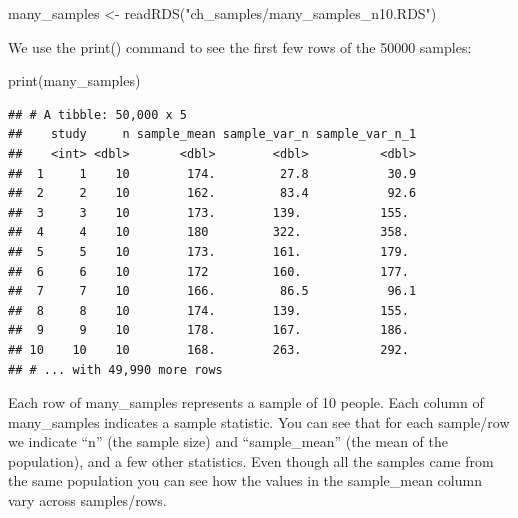 \documentclass[
]{krantz}
\makeatletter
\newenvironment{Shaded}{\begin{snugshade}}{\end{snugshade}}
\newcommand{\FunctionTok}[1]{\textcolor[rgb]{0,0,0}{#1}}
\newcommand{\NormalTok}[1]{#1}
\newcommand{\OtherTok}[1]{\textcolor[rgb]{0.37,0.37,0.37}{#1}}
\newcommand{\StringTok}[1]{\textcolor[rgb]{0.5,0.5,0.5}{#1}}
\newenvironment{kframe}{%
\medskip{}
\setlength{\fboxsep}{.8em}
 \def\at@end@of@kframe{}%
 \ifinner\ifhmode%
  \def\at@end@of@kframe{\end{minipage}}%
  \begin{minipage}{\columnwidth}%
 \fi\fi%
 \def\FrameCommand##1{\hskip\@totalleftmargin \hskip-\fboxsep
 \colorbox{shadecolor}{##1}\hskip-\fboxsep
     \hskip-\linewidth \hskip-\@totalleftmargin \hskip\columnwidth}%
 \MakeFramed {\advance\hsize-\width
   \@totalleftmargin\z@ \linewidth\hsize
   \@setminipage}}%
 {\par\unskip\endMakeFramed%
 \at@end@of@kframe}
\renewenvironment{Shaded}{\begin{kframe}}{\end{kframe}}
\makeatother
\begin{document}
\begin{Shaded}
\begin{Highlighting}[]
\NormalTok{many\_samples }\OtherTok{\textless{}{-}} \FunctionTok{readRDS}\NormalTok{(}\StringTok{"ch\_samples/many\_samples\_n10.RDS"}\NormalTok{)}
\end{Highlighting}
\end{Shaded}

We use the print() command to see the first few rows of the 50000 samples:

\begin{Shaded}
\begin{Highlighting}[]
\FunctionTok{print}\NormalTok{(many\_samples)}
\end{Highlighting}
\end{Shaded}

\begin{verbatim}
## # A tibble: 50,000 x 5
##    study     n sample_mean sample_var_n sample_var_n_1
##    <int> <dbl>       <dbl>        <dbl>          <dbl>
##  1     1    10        174.         27.8           30.9
##  2     2    10        162.         83.4           92.6
##  3     3    10        173.        139.           155. 
##  4     4    10        180         322.           358. 
##  5     5    10        173.        161.           179. 
##  6     6    10        172         160.           177. 
##  7     7    10        166.         86.5           96.1
##  8     8    10        174.        139.           155. 
##  9     9    10        178.        167.           186. 
## 10    10    10        168.        263.           292. 
## # ... with 49,990 more rows
\end{verbatim}

Each row of many\_samples represents a sample of 10 people. Each column of many\_samples indicates a sample statistic. You can see that for each sample/row we indicate ``n'' (the sample size) and ``sample\_mean'' (the mean of the population), and a few other statistics. Even though all the samples came from the same population you can see how the values in the sample\_mean column vary across samples/rows.
\end{document}
